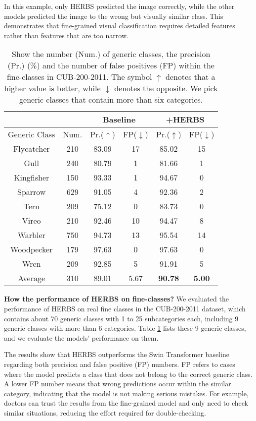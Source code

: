 \documentclass[journal]{IEEEtran}
\begin{document}
In this example, only HERBS predicted the image correctly, while the other models predicted the image to the wrong but visually similar class. This demonstrates that fine-grained visual classification requires detailed features rather than features that are too narrow.


\begin{table}
\begin{center}
\begin{tabular}{|c|c|c|c|c|c|}
\hline
\multicolumn{2}{|c|}{} & \multicolumn{2}{|c|}{Baseline} & \multicolumn{2}{|c|}{+HERBS}\\
\hline
Generic Class & Num. & Pr.($\uparrow$) & FP($\downarrow$)  & Pr.($\uparrow$) & FP($\downarrow$) \\
\hline
Flycatcher & 210 & 83.09 & 17 & 85.02 & 15\\
Gull & 240  & 80.79 & 1 & 81.66 & 1\\
Kingfisher & 150 & 93.33 & 1 & 94.67 & 0\\
Sparrow & 629 & 91.05 & 4 & 92.36 & 2\\
Tern & 209 & 75.12 & 0 & 83.73 & 0\\
Vireo & 210 & 92.46 & 10 & 94.47 & 8\\
Warbler & 750 & 94.73 & 13 & 95.54 & 14\\
Woodpecker & 179 & 97.63 & 0 & 97.63 & 0\\
Wren & 209 & 92.85 & 5 & 91.91 & 5\\
\hline
Average & 310 & 89.01 & 5.67 & \textbf{90.78} & \textbf{5.00}\\
\hline
\end{tabular}
\end{center}
\caption{Show the number (Num.) of generic classes, the precision (Pr.) (\%) and the number of false positives (FP) within the fine-classes in CUB-200-2011. The symbol $\uparrow$ denotes that a higher value is better, while $\downarrow$ denotes the opposite. We pick generic classes that contain more than six categories.}
\label{tab4}
\end{table}


\textbf{How the performance of HERBS on fine-classes?} We evaluated the performance of HERBS on real fine classes in the CUB-200-2011 dataset, which contains about 70 generic classes with 1 to 25 subcategories each, including 9 generic classes with more than 6 categories. Table \ref{tab4} lists these 9 generic classes, and we evaluate the models' performance on them.

The results show that HERBS outperforms the Swin Transformer baseline regarding both precision and false positive (FP) numbers. FP refers to cases where the model predicts a class that does not belong to the correct generic class. A lower FP number means that wrong predictions occur within the similar category, indicating that the model is not making serious mistakes. For example, doctors can trust the results from the fine-grained model and only need to check similar situations, reducing the effort required for double-checking.
\end{document}
